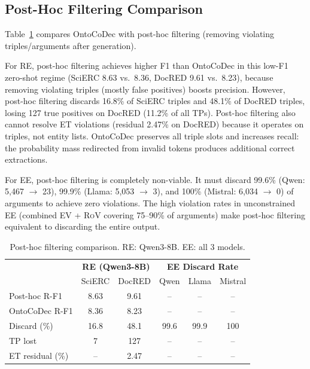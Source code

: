 \documentclass[11pt,a4paper]{article}
\newcommand{\ours}{OntoCoDec}
\newcommand{\etsym}{\textsc{ET}}
\newcommand{\evsym}{\textsc{EV}}
\newcommand{\rovsym}{\textsc{RoV}}
\begin{document}
\subsection{Post-Hoc Filtering Comparison}
\label{sec:posthoc}

Table~\ref{tab:posthoc} compares \ours{} with post-hoc filtering (removing violating triples/arguments after generation).

For RE, post-hoc filtering achieves higher F1 than \ours{} in this low-F1 zero-shot regime (SciERC 8.63 vs.\ 8.36, DocRED 9.61 vs.\ 8.23), because removing violating triples (mostly false positives) boosts precision. However, post-hoc filtering discards 16.8\% of SciERC triples and 48.1\% of DocRED triples, losing 127 true positives on DocRED (11.2\% of all TPs). Post-hoc filtering also cannot resolve \etsym{} violations (residual 2.47\% on DocRED) because it operates on triples, not entity lists. \ours{} preserves all triple slots and increases recall: the probability mass redirected from invalid tokens produces additional correct extractions.

For EE, post-hoc filtering is completely non-viable. It must discard 99.6\% (Qwen: 5,467 $\to$ 23), 99.9\% (Llama: 5,053 $\to$ 3), and 100\% (Mistral: 6,034 $\to$ 0) of arguments to achieve zero violations. The high violation rates in unconstrained EE (combined \evsym{} + \rovsym{} covering 75--90\% of arguments) make post-hoc filtering equivalent to discarding the entire output.

\begin{table}[t]
\centering
\caption{Post-hoc filtering comparison. RE: Qwen3-8B. EE: all 3 models.}
\label{tab:posthoc}
\small
\begin{tabular}{lcc|ccc}
\toprule
& \multicolumn{2}{c|}{\textbf{RE (Qwen3-8B)}} & \multicolumn{3}{c}{\textbf{EE Discard Rate}} \\
& SciERC & DocRED & Qwen & Llama & Mistral \\
\midrule
Post-hoc R-F1 & 8.63 & 9.61 & -- & -- & -- \\
\ours{} R-F1 & 8.36 & 8.23 & -- & -- & -- \\
\midrule
Discard (\%) & 16.8 & 48.1 & 99.6 & 99.9 & 100 \\
TP lost & 7 & 127 & -- & -- & -- \\
ET residual (\%) & -- & 2.47 & -- & -- & -- \\
\bottomrule
\end{tabular}
\end{table}
\end{document}
